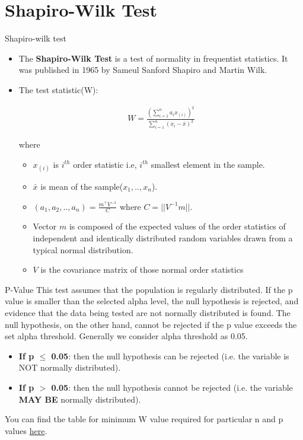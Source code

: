 \documentclass[10pt]{beamer}
\begin{document}
\section{Shapiro-Wilk Test}
\begin{frame}{Shapiro-wilk test}
   \begin{itemize}
       \item The \textbf{Shapiro-Wilk Test } is a test of normality in frequentist statistics. It was published in 1965 by Sameul Sanford Shapiro and Martin Wilk.
       \item The test statistic(W):
       \begin{block}{}
\begin{align}
    W=\frac{\left(\sum_{i=1}^{n}a_{i}x_{(i)}\right)^{2}}{\sum_{i=1}^{n}(x_{i}-\bar{x})^{2}}
\end{align}
\end{block}
where
\begin{itemize}
    \item $x_{(i)}$ is $i^{th}$ order statistic i.e, $i^{th}$ smallest element in the sample.
    \item $\bar{x}$ is mean of the sample($x_{1},..,x_{n}$). 
    \item $(a_{1},a_{2},..,a_{n})=\frac{m^{\top}V^{-1}}{C}$ where $C=||V^{-1}m||$.
    \item Vector $m$ is composed of the expected values of the order statistics of independent and identically distributed random variables drawn from a typical normal distribution.
    \item $V$ is the covariance matrix of those normal order statistics
\end{itemize}
   \end{itemize} 
\end{frame}
\begin{frame}{P-Value}
    This test assumes that the population is regularly distributed. If the p value is smaller than the selected alpha level, the null hypothesis is rejected, and evidence that the data being tested are not normally distributed is found. The null hypothesis, on the other hand, cannot be rejected if the p value exceeds the set alpha threshold. Generally we consider alpha threshold as 0.05.
\begin{itemize}
    \item \textbf{If p $\leq$ 0.05}: then the null hypothesis can be rejected (i.e. the variable is NOT normally distributed).
    \item \textbf{If p $>$ 0.05}: then the null hypothesis cannot be rejected (i.e. the variable \color{red} \textbf{MAY BE} \color{black}normally distributed).
\end{itemize}
You can find the table for minimum W value required for particular  n and p values
\href{https://github.com/cmaspi/verifying_CLT/tree/main/latex/report/images/p_value}{here}.
\end{frame}
\end{document}
